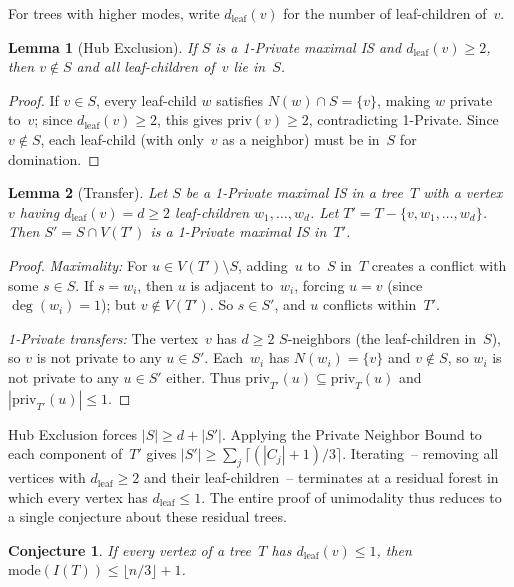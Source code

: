 \documentclass[12pt,oneside]{article}
\newtheorem{lemma}{Lemma}
\newtheorem{conjecture}{Conjecture}
\theoremstyle{remark}
\begin{document}
For trees with higher modes, write $d_{\mathrm{leaf}}(v)$ for the number of leaf-children of~$v$.

\begin{lemma}[Hub Exclusion]\label{lem:hub-excl}
  If $S$ is a 1-Private maximal IS and $d_{\mathrm{leaf}}(v) \ge 2$, then $v \notin S$ and all leaf-children of~$v$ lie in~$S$.
\end{lemma}

\begin{proof}
If $v \in S$, every leaf-child $w$ satisfies $N(w) \cap S = \{v\}$, making $w$ private to~$v$; since $d_{\mathrm{leaf}}(v) \ge 2$, this gives $\mathrm{priv}(v) \ge 2$, contradicting 1-Private.
Since $v \notin S$, each leaf-child (with only~$v$ as a neighbor) must be in~$S$ for domination.
\end{proof}

\begin{lemma}[Transfer]\label{lem:transfer}
  Let $S$ be a 1-Private maximal IS in a tree~$T$ with a vertex~$v$ having $d_{\mathrm{leaf}}(v) = d \ge 2$ leaf-children $w_1, \dotsc, w_d$.
  Let $T' = T - \{v, w_1, \dotsc, w_d\}$.
  Then $S' = S \cap V(T')$ is a 1-Private maximal IS in~$T'$.
\end{lemma}

\begin{proof}
\emph{Maximality:} For $u \in V(T') \setminus S$, adding~$u$ to~$S$ in~$T$ creates a conflict with some $s \in S$.
If $s = w_i$, then $u$ is adjacent to~$w_i$, forcing $u = v$ (since $\deg(w_i) = 1$); but $v \notin V(T')$.
So $s \in S'$, and $u$ conflicts within~$T'$.

\emph{1-Private transfers:} The vertex~$v$ has $d \ge 2$ $S$-neighbors (the leaf-children in~$S$), so $v$ is not private to any $u \in S'$.
Each~$w_i$ has $N(w_i) = \{v\}$ and $v \notin S$, so $w_i$ is not private to any $u \in S'$ either.
Thus $\mathrm{priv}_{T'}(u) \subseteq \mathrm{priv}_T(u)$ and $|\mathrm{priv}_{T'}(u)| \le 1$.
\end{proof}

Hub Exclusion forces $|S| \ge d + |S'|$.
Applying the Private Neighbor Bound to each component of~$T'$ gives $|S'| \ge \sum_j \lceil(|C_j|+1)/3\rceil$.
Iterating~-- removing all vertices with $d_{\mathrm{leaf}} \ge 2$ and their leaf-children~-- terminates at a residual forest in which every vertex has $d_{\mathrm{leaf}} \le 1$.
The entire proof of unimodality thus reduces to a single conjecture about these residual trees.

\begin{conjecture}\label{conj:A}
  If every vertex of a tree~$T$ has $d_{\mathrm{leaf}}(v) \le 1$, then $\mathrm{mode}(I(T)) \le \lfloor n/3 \rfloor + 1$.
\end{conjecture}
\end{document}
